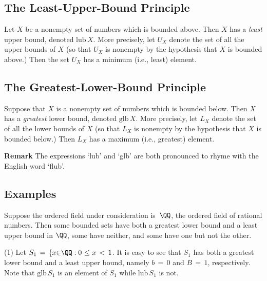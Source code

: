             \subsection{\small{\bf The Least-Upper-Bound Principle}}
            \label{DefB30.08D}

        Let $X$ be a nonempty set of numbers which is bounded above. Then $X$ has a {\em least} upper bound, denoted $\mbox{lub}\,X$.
    More precisely, let $U_{X}$ denote the set of all the upper bounds of $X$ (so that $U_{X}$ is nonempty by the hypothesis that $X$ is bounded above.)
    Then the set $U_{X}$ has a minimum (i.e., least) element.

\VV


\V

            \subsection{\small{{\bf The Greatest-Lower-Bound Principle}}}
            \label{DefB30.08G}

\V

        Suppose that $X$ is a nonempty set of numbers which is bounded below. Then $X$ has a {\em greatest} lower bound, denoted $\mbox{glb}\,X$.
    More precisely, let $L_{X}$ denote the set of all the lower bounds of $X$ (so that $L_{X}$ is nonempty by the hypothesis that $X$ is bounded below.)
    Then $L_{X}$ has a maximum (i.e., greatest) element.

\V

        {\bf Remark} The expressions `lub' and `glb' are both pronounced to rhyme with the English word `flub'.


\VV

            \subsection{\small{\bf Examples}}
            \label{ExamplB08.08I}

       Suppose the ordered field under consideration is~${\QQ}$, the ordered field of rational numbers.
    Then some bounded sets have both a greatest lower bound and a least upper bound in ${\QQ}$, some have neither, and some have one but not the other.

\V

        (1) Let $S_{1} \,=\, \{x{\in}{\QQ}: 0\,\,{\leq}\,\,x\,<\,1$. It is easy to see that $S_{1}$ has both a greatest lower bound and a least upper bound, 
    namely $b \,=\, 0$ and $B \,=\, 1$, respectively.
    Note that $\mbox{glb}\,S_{1}$ is an element of $S_{1}$ while $\mbox{lub}\,S_{1}$ is not.

